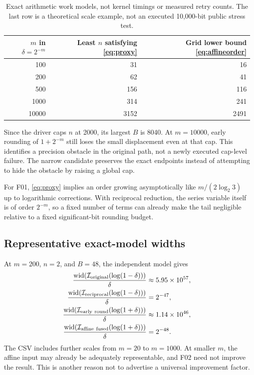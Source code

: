 \documentclass[11pt,letterpaper]{article}
\newcommand{\I}{\mathcal I}
\newcommand{\width}{\operatorname{wid}}
\theoremstyle{remark}\newtheorem{remark}[proposition]{Remark}
\begin{document}
\begin{table}[htbp]
\centering
\begin{tabular}{@{}rrr@{}}
\toprule
$m$ in $\delta=2^{-m}$ & Least $n$ satisfying \eqref{eq:proxy} & Grid lower bound \eqref{eq:affineorder} \\
\midrule
100 & 31 & 16 \\
200 & 62 & 41 \\
500 & 156 & 116 \\
1000 & 314 & 241 \\
10000 & 3152 & 2491 \\
\bottomrule
\end{tabular}
\caption{Exact arithmetic work models, not kernel timings or measured retry
counts. The last row is a theoretical scale example, not an executed
10,000-bit public stress test.}
\end{table}

Since the driver caps $n$ at 2000, its largest $B$ is 8040. At $m=10000$,
early rounding of $1+2^{-m}$ still loses the small displacement even at that
cap. This identifies a precision obstacle in the original path, not a newly
executed cap-level failure. The narrow candidate preserves the exact
endpoints instead of attempting to hide the obstacle by raising a global cap.

For F01, \eqref{eq:proxy} implies an order growing asymptotically like
$m/(2\log_2 3)$ up to logarithmic corrections. With reciprocal reduction,
the series variable itself is of order $2^{-m}$, so a fixed number of terms
can already make the tail negligible relative to a fixed significant-bit
rounding budget.

\subsection{Representative exact-model widths}
At $m=200$, $n=2$, and $B=48$, the independent model gives
\begin{align*}
 \frac{\width(\I_{\rm original}(\log(1-\delta)))}{\delta}
   &\approx5.95\times10^{57},\\
 \frac{\width(\I_{\rm reciprocal}(\log(1-\delta)))}{\delta}
   &=2^{-47},\\
 \frac{\width(\I_{\rm early\ round}(\log(1+\delta)))}{\delta}
   &\approx1.14\times10^{46},\\
 \frac{\width(\I_{\rm affine\ fused}(\log(1+\delta)))}{\delta}
   &=2^{-48}.
\end{align*}
The CSV includes further scales from $m=20$ to $m=1000$. At smaller $m$, the
affine input may already be adequately representable, and F02 need not
improve the result. This is another reason not to advertise a universal
improvement factor.
\end{document}
